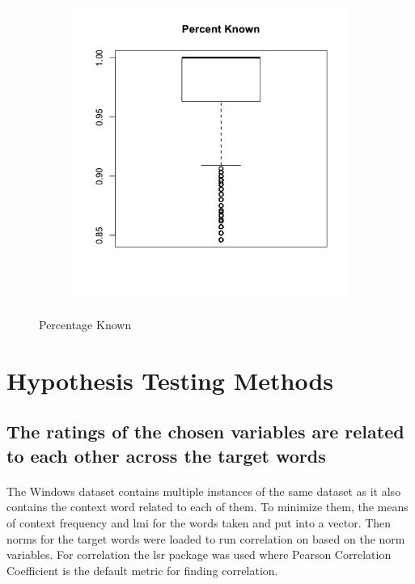 \documentclass[11pt,a4paper]{article}
\begin{document}
\begin{figure}[H]
\begin{subfigure}[b]{0.4\linewidth}
  \end{subfigure}
  \begin{subfigure}[b]{0.4\linewidth}
    \includegraphics[width=\linewidth]{images/box_perc_known.png}
  \end{subfigure}
  \caption{Percentage Known}
  \label{fig:pk}
\end{figure}

\section{Hypothesis Testing Methods}

\subsection{The ratings of the chosen variables are related to each other across the target words}
\paragraph{}
The Windows dataset contains multiple instances of the same dataset as it also contains the context word related to each of them. To minimize them, the means of context frequency and lmi for the words taken and put into a vector. Then norms for the target words were loaded to run correlation on based on the norm variables. For correlation the lsr\cite{lsr} package was used where Pearson Correlation Coefficient\cite{pearson} is the default metric for finding correlation.
\end{document}
